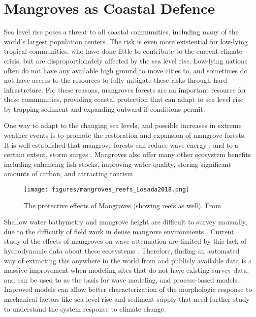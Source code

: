 \section{Mangroves as Coastal Defence}

Sea level rise poses a threat to all coastal communities, including many of the world's largest population centers. The risk is even more existential for low-lying tropical communities, who have done little to contribute to the current climate crisis, but are disproportionately affected by the sea level rise. Low-lying nations often do not have any available high ground to move cities to, and sometimes do not have access to the resources to fully mitigate these risks through hard infrastrcture. For these reasons, mangroves forests are an important resource for these communities, providing coastal protection that can adapt to sea level rise by trapping sediment and expanding outward if conditions permit.

One way to adapt to the changing sea levels, and possible increases in extreme weather events is to promote the restoration and expansion of mangrove forests. It is well-established that mangrove forests can reduce wave energy \parencite{Maza2019,Menendez2020}, and to a certain extent, storm surges \parencite{Montgomery2019a,Chen2021,Mcivor2012}. Mangroves also offer many other ecosystem benefits including enhancing fish stocks, improving water quality, storing significant amounts of carbon, and attracting tourism \parencite{Atkinson2016b}

\begin{figure}[htbp]
      \centering
      \texttt{[image: figures/mangroves\_reefs\_Losada2018.png]}
      \caption{The protective effects of Mangroves (showing reefs as well). From \parencite{Losada2018}}
      \label{mangrove-protection-diagram}
\end{figure}

Shallow water bathymetry and mangrove height are difficult to survey manually, due to the difficutly of field work in dense mangrove environments \parencite{Gijsman2021}. Current study of the effects of mangroves on wave attenuation are limited by this lack of hydrodynamic data about these ecosystems \parencite{Horstman2014}.  Therefore, finding an automated way of extracting this anywhere in the world from and publicly available data is a massive improvement when modeling sites that do not have existing survey data, and can be used to as the basis for wave modeling, and process-based models. Improved models can allow better characterization of the morphologic response to mechanical factors like sea level rise and sediment supply that need further study to understand the system response to climate change.

